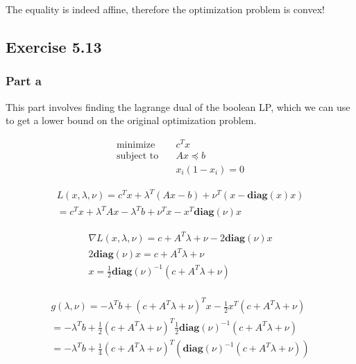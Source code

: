 The equality is indeed affine, therefore the optimization problem is convex!

\subsection{Exercise 5.13}
\subsubsection{Part a}
This part involves finding the lagrange dual of the boolean LP, which we can use to get a lower bound on the original optimization problem.

\begin{align}
  \text{minimize} & \quad c^T x \\
  \text{subject to} & \quad Ax \preceq b \\
  & \quad x_i(1-x_i) = 0
\end{align}

\begin{equation}
  \begin{aligned}
    L(x, \lambda, \nu) = c^T x + \lambda^T(Ax - b) + \nu^T (x- \textbf{diag}(x)x) \\  
    = c^T x + \lambda^TAx - \lambda^T b + \nu^T x- x^T \textbf{diag}(\nu) x
  \end{aligned}
\end{equation}

\begin{equation}
  \begin{aligned}
    \nabla L(x, \lambda, \nu) = c + A^T \lambda + \nu - 2 \textbf{diag}(\nu) x \\
    2 \textbf{diag}(\nu) x = c + A^T \lambda + \nu \\
    x = \frac{1}{2} \textbf{diag}(\nu) ^{-1} (c + A^T \lambda + \nu )\\
  \end{aligned}
\end{equation}

\begin{equation}
  \begin{aligned}
    g(\lambda, \nu) = -\lambda^T b + (c + A^T \lambda + \nu )^T x - \frac{1}{2} x^T(c + A^T \lambda + \nu) \\ 
    = -\lambda^T b + \frac{1}{2} (c + A^T \lambda + \nu)^T \frac{1}{2} \textbf{diag}(\nu) ^{-1} (c + A^T \lambda + \nu ) \\ 
    = -\lambda^T b + \frac{1}{4} (c + A^T \lambda + \nu)^T (\textbf{diag}(\nu) ^{-1} (c + A^T \lambda + \nu ))
  \end{aligned}
\end{equation}

